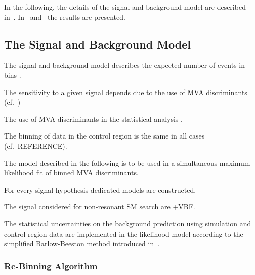 In the following, the details of the signal and background model are
described in~. In~
and~ the results are presented.


\subsection{The Signal and Background Model}%
\label{sec:sig_bkg_model}

The signal and background model describes the expected number of
events in bins .

The sensitivity to a given signal depends due to the use of MVA
discriminants (cf.\ )

The use of MVA discriminants in the statistical analysis .

The binning of data in the \ZHF control region is the same in all
cases (cf.\ REFERENCE).


The model described in the following is to be used in a simultaneous
maximum likelihood fit of binned MVA discriminants.

For every signal hypothesis dedicated models are constructed.

The signal considered for non-resonant SM \HH search are \ggF+VBF.


The statistical uncertainties on the background prediction using
simulation and control region data are implemented in the likelihood
model according to the simplified Barlow-Beeston method introduced
in~.


\subsubsection{Re-Binning Algorithm}%
\label{sec:binning_alg}

